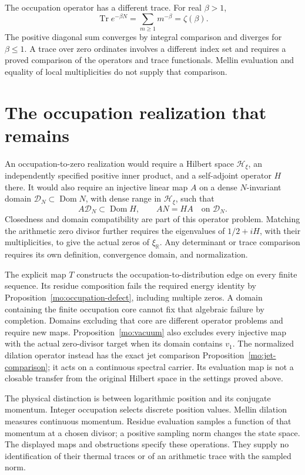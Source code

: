 The occupation operator has a different trace. For real $\beta>1$,
\[
 \operatorname{Tr}e^{-\beta N}=\sum_{m\geq1}m^{-\beta}
 =\zeta(\beta).
\]
The positive diagonal sum converges by integral comparison and
diverges for $\beta\leq1$. A trace over zero ordinates involves
a different index set and requires a proved comparison of the
operators and trace functionals. Mellin evaluation and equality
of local multiplicities do not supply that comparison.

\section{The occupation realization that remains}

An occupation-to-zero realization would require a Hilbert space
$\mathscr H_\xi$, an independently specified positive inner product,
and a self-adjoint operator $H$ there. It would also require an
injective linear map $A$ on a dense $N$-invariant domain
$\mathscr D_N\subset\operatorname{Dom}N$, with dense range in
$\mathscr H_\xi$, such that
\[
 A\mathscr D_N\subset\operatorname{Dom}H,\qquad
 AN=HA\quad\text{on }\mathscr D_N.
\]
Closedness and domain compatibility are part of this operator
problem. Matching the arithmetic zero divisor further requires
the eigenvalues of $1/2+iH$, with their multiplicities, to give
the actual zeros of $\xi_{\mathbb R}$. Any determinant or trace
comparison requires its own definition, convergence domain, and
normalization.

The explicit map $T$ constructs the occupation-to-distribution
edge on every finite sequence. Its residue composition fails the
required energy identity by Proposition~\ref{mo:occupation-defect}, including
multiple zeros. A domain containing the finite occupation core
cannot fix that algebraic failure by completion. Domains excluding
that core are different operator problems and require new maps.
Proposition~\ref{mo:vacuum} also excludes every injective map
with the actual zero-divisor target when its domain contains $v_1$.
The normalized dilation operator instead has the exact jet
comparison Proposition~\ref{mo:jet-comparison}; it acts on a continuous
spectral carrier. Its evaluation map is not a closable transfer
from the original Hilbert space in the settings proved above.

The physical distinction is between logarithmic position and its
conjugate momentum. Integer occupation selects discrete position
values. Mellin dilation measures continuous momentum. Residue
evaluation samples a function of that momentum at a chosen divisor;
a positive sampling norm changes the state space. The displayed
maps and obstructions specify these operations. They supply no
identification of their thermal traces or of an arithmetic trace
with the sampled norm.

